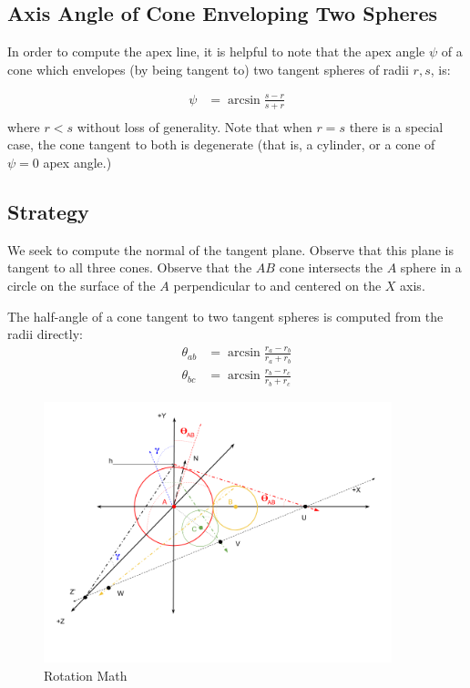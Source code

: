 \documentclass{article}
\begin{document}
\subsection{Axis Angle of Cone Enveloping Two Spheres}

In order to compute the apex line, it is helpful
to note that the apex angle $\psi$ of a cone which envelopes (by being tangent to) two tangent
spheres of radii $r,s$, is:

\begin{align}
 \psi &= \arcsin{\frac{s - r}{s + r}} \\
\end{align}
where $r < s$ without loss of generality. Note that when $r = s$
there is a special case,
the cone tangent to both is degenerate (that is, a cylinder, or a cone of
$\psi = 0$ apex angle.)

\subsection{Strategy}

We seek to compute the normal of the tangent plane.
Observe that this plane is tangent to all three cones.
Observe that the $AB$ cone intersects
the $A$ sphere in a circle on the surface of the $A$ perpendicular to and centered on the $X$ axis.

The half-angle of a cone tangent to two tangent spheres is computed from the radii directly:
\begin{align}
  \theta_{ab} &= \arcsin{\frac{r_a - r_b}{r_a + r_b}} \\
  \theta_{bc} &= \arcsin{\frac{r_b - r_c}{r_b + r_c}}
\end{align}


\begin{figure}
     \centering
     \includegraphics[width=0.9\textwidth]{figures/RotationMath.png}
     \caption{Rotation Math}
  \label{fig:rotation}
\end{figure}
\end{document}
